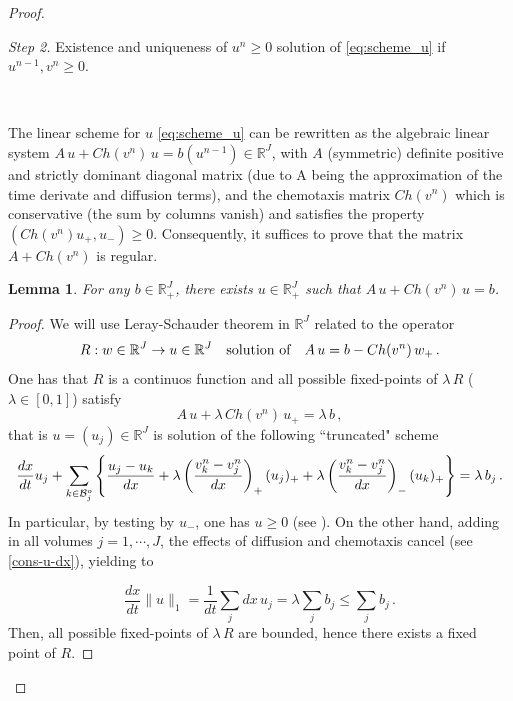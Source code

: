 \documentclass[11pt]{article}
\newtheorem{lemma}[theorem]{Lemma}
\numberwithin{theorem}{section}
\begin{document}
\begin{proof}
\

{\it Step 2.}
  Existence and uniqueness of $u^n\geq0$ solution of \eqref{eq:scheme_u} if $u^{n-1},v^{n}\ge 0$. 
  
  \
 
 The linear scheme  for $u$ \eqref{eq:scheme_u} can be rewritten as the algebraic linear system $A\, u+C\!h(v^n)\, u =b(u^{n-1})\in \mathbb{R}^J$, with $A$ (symmetric) definite positive and  strictly dominant diagonal matrix (due to A being the approximation of the time derivate and diffusion terms), %
  and the chemotaxis matrix  $C\!h(v^n)$ which is conservative (the sum by columns vanish) and satisfies   the  property  $(C\!h(v^n) u_+,u_-)\ge 0 $. Consequently,  it suffices to prove that the matrix $A+ Ch(v^n) $ is regular. 
 
% 
\begin{lemma}  \label{sol-pos}
 For any $b\in \mathbb{R}^J_+$, there exists $u\in \mathbb{R}^J_+$ such that $A\, u+Ch(v^n)\, u =b$.
 \end{lemma} 
 \begin{proof}  We will use Leray-Schauder theorem in $\mathbb{R}^J$ related to the operator
 $$
 R: w\in \mathbb{R}^J \to u\in \mathbb{R}^J 
 \quad \hbox{solution of} \quad
 A\,u=b-Ch(v^n)\,w_+ \,.
 $$
 One has that $R$ is a continuos function and all possible fixed-points of  $\lambda \,R$ ($\lambda \in [0,1]$) satisfy 
 $$A\,u + \lambda \,Ch(v^n)\,u_+=\lambda \,b\,,
 $$
 that is $u=(u_j)\in \mathbb{R}^J$ is solution of the following  ``truncated" scheme 
 $$
\frac{dx }{dt} u_j
+\sum_{k\in {\cal B}_j^o }  \left\{  \frac{u_{j}-u_k}{dx}
+\lambda \left(\frac{v_{k}^n-v_j^{n}}{dx}\right)_+(u_j)_+  
+\lambda \left(\frac{v_{k}^n-v_j^{n}}{dx}\right)_-(u_{k})_+ \right\}
= \lambda\, b_j\, . 
 $$
  In particular, by testing by $u_-$, one has $u\ge 0$ (see \cite{Saito}). On the other hand, 
  adding in all volumes $j=1,\cdots, J$, the effects of diffusion and chemotaxis cancel (see \eqref{cons-u-dx}), yielding to
  
 $$
 \frac{dx}{dt} \|u\|_1= \frac1{dt}\sum_j dx \, u_j =\lambda \sum_j b_j \le \sum_j b_j \,.
 $$
 Then, all possible fixed-points of $\lambda \,R$ are bounded, hence there exists a fixed point of $R$.
 \end{proof}
 

\end{proof}
\end{document}
